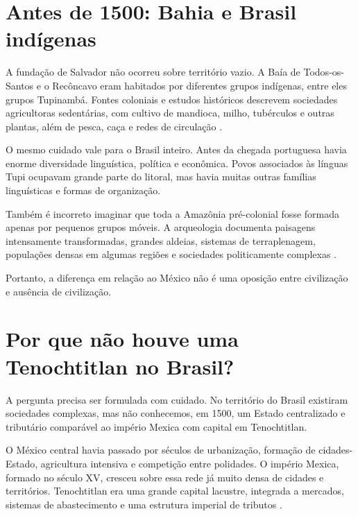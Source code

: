 \section{Antes de 1500: Bahia e Brasil
indígenas}
\label{section-brasil-antes-1500}

A fundação de Salvador não ocorreu sobre
território vazio. A Baía de Todos-os-Santos
e o Recôncavo eram habitados por diferentes
grupos indígenas, entre eles grupos
Tupinambá. Fontes coloniais e estudos
históricos descrevem sociedades
agricultoras sedentárias, com cultivo de
mandioca, milho, tubérculos e outras plantas,
além de pesca, caça e redes de circulação
\cite{oleary2024horticulture,neubauer2021}.

O mesmo cuidado vale para o Brasil inteiro.
Antes da chegada portuguesa havia enorme
diversidade linguística, política e
econômica. Povos associados às línguas
Tupi ocupavam grande parte do litoral, mas
havia muitas outras famílias linguísticas
e formas de organização.

Também é incorreto imaginar que toda a
Amazônia pré-colonial fosse formada apenas
por pequenos grupos móveis. A arqueologia
documenta paisagens intensamente
transformadas, grandes aldeias, sistemas de
terraplenagem, populações densas em algumas
regiões e sociedades politicamente
complexas \cite{gomes2018indigenous,
roosevelt1999amazonia,
iriarte2018earthworks}.

Portanto, a diferença em relação ao México
não é uma oposição entre civilização e
ausência de civilização.

\section{Por que não houve uma Tenochtitlan
no Brasil?}
\label{section-brasil-mexico-estados}

A pergunta precisa ser formulada com
cuidado. No território do Brasil existiram
sociedades complexas, mas não conhecemos,
em 1500, um Estado centralizado e tributário
comparável ao império Mexica com capital em
Tenochtitlan.

O México central havia passado por séculos
de urbanização, formação de cidades-Estado,
agricultura intensiva e competição entre
polidades. O império Mexica, formado no
século XV, cresceu sobre essa rede já muito
densa de cidades e territórios. Tenochtitlan
era uma grande capital lacustre, integrada a
mercados, sistemas de abastecimento e uma
estrutura imperial de tributos
\cite{smith2021aztec,rojas2016tenochtitlan}.

